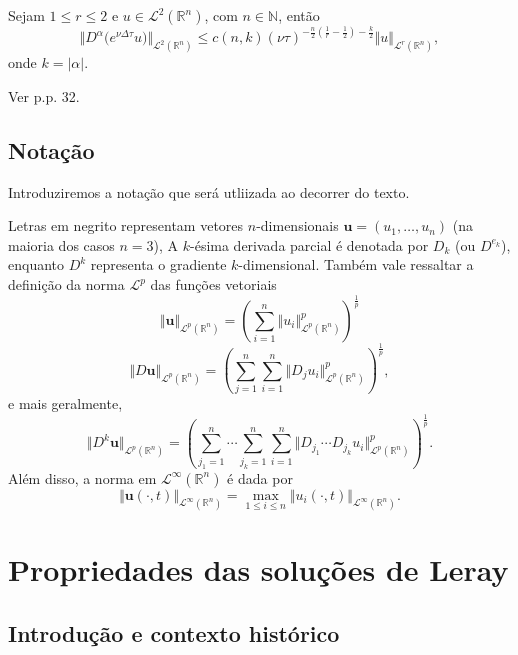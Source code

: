 \documentclass[a4paper, 11pt]{book}
\theoremstyle{definition}
\newcommand{\bN}{\mathbb{N}}
\newcommand{\bR}{\mathbb{R}}
\newcommand{\bu}{\mathbf{u}}
\newcommand{\cL}{\mathcal{L}}
\begin{document}
\begin{pbox}
    Sejam $1 \leqslant r \leqslant 2$ e $u \in \cL^2(\bR^n)$, com $n \in \bN$, então
    \begin{equation} \label{eq:estimativa-util}
        \Vert D^{\alpha} \big( e^{\nu\Delta\tau} u \big) \Vert_{\cL^2(\bR^n)} \leqslant c(n,k) (\nu\tau)^{-\frac{n}{2}\left( \frac{1}{r} - \frac{1}{2} \right) - \frac{k}{2}} \Vert u \Vert_{\cL^r(\bR^n)},
    \end{equation} 
    onde $k = |\alpha|$.
\end{pbox}
\begin{prf}
    Ver \cite{lorenz-navier.stokes} p.p. 32.
\end{prf}

\subsection{Notação}

Introduziremos a notação que será utliizada ao decorrer do texto.   

Letras em negrito representam vetores $n$-dimensionais $\bu = (u_1,\dots,u_n)$ (na maioria dos casos $n = 3$),
A $k$-ésima derivada parcial é denotada por $D_k$ (ou $D^{e_k}$), enquanto $D^k$ representa o gradiente $k$-dimensional.
Também vale ressaltar a definição da norma $\cL^p$ das funções vetoriais
\[
    \Vert \bu \Vert_{\cL^p(\bR^n)} = \left( \sum_{i=1}^n \Vert u_i \Vert_{\cL^p(\bR^n)}^p \right)^{\frac{1}{p}}
\]
\[
    \Vert D\bu \Vert_{\cL^p(\bR^n)} = \left( \sum_{j=1}^n\sum_{i=1}^n \Vert D_ju_i \Vert_{\cL^p(\bR^n)}^p \right)^{\frac{1}{p}},
\]
e mais geralmente,
\[
    \Vert D^k\bu \Vert_{\cL^p(\bR^n)} = \left( \sum_{j_1 = 1}^n \cdots \sum_{j_k  =1}^{n}\sum_{i=1}^n \Vert D_{j_1} \cdots D_{j_k}u_i \Vert_{\cL^p(\bR^n)}^p \right)^{\frac{1}{p}}.
\]
Além disso, a norma em $\cL^\infty(\bR^n)$ é dada por
\[
    \Vert \bu(\cdot,t) \Vert_{\cL^\infty(\bR^n)} = \max_{1 \leqslant i \leqslant n} \Vert u_i(\cdot,t) \Vert_{\cL^\infty(\bR^n)}.
\]

\section{Propriedades das soluções de Leray}

\subsection{Introdução e contexto histórico} \label{sec:intro}
\end{document}
